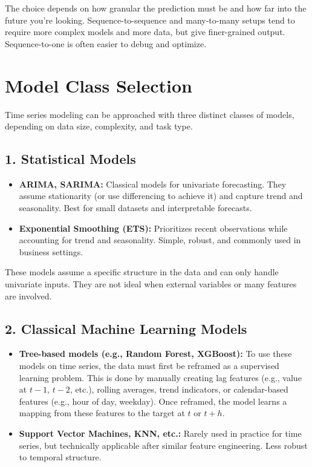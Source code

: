 \documentclass[12pt,openany]{book}
\begin{document}
The choice depends on how granular the prediction must be and how far into the future you're looking. Sequence-to-sequence and many-to-many setups tend to require more complex models and more data, but give finer-grained output. Sequence-to-one is often easier to debug and optimize.


\section{Model Class Selection}

Time series modeling can be approached with three distinct classes of models, depending on data size, complexity, and task type.

\subsection*{1. Statistical Models}

\begin{itemize}
    \item \textbf{ARIMA, SARIMA:} Classical models for univariate forecasting. They assume stationarity (or use differencing to achieve it) and capture trend and seasonality. Best for small datasets and interpretable forecasts.
    
    \item \textbf{Exponential Smoothing (ETS):} Prioritizes recent observations while accounting for trend and seasonality. Simple, robust, and commonly used in business settings.
\end{itemize}

These models assume a specific structure in the data and can only handle univariate inputs. They are not ideal when external variables or many features are involved.

\subsection*{2. Classical Machine Learning Models}

\begin{itemize}
    \item \textbf{Tree-based models (e.g., Random Forest, XGBoost):} To use these models on time series, the data must first be reframed as a supervised learning problem. This is done by manually creating lag features (e.g., value at $t-1$, $t-2$, etc.), rolling averages, trend indicators, or calendar-based features (e.g., hour of day, weekday). Once reframed, the model learns a mapping from these features to the target at $t$ or $t+h$.
    
    \item \textbf{Support Vector Machines, KNN, etc.:} Rarely used in practice for time series, but technically applicable after similar feature engineering. Less robust to temporal structure.
\end{itemize}
\end{document}
